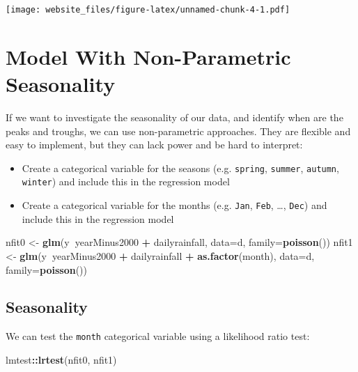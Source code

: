 \documentclass[]{book}
\newenvironment{Shaded}{\begin{snugshade}}{\end{snugshade}}
\newcommand{\KeywordTok}[1]{\textcolor[rgb]{0.13,0.29,0.53}{\textbf{#1}}}
\newcommand{\DataTypeTok}[1]{\textcolor[rgb]{0.13,0.29,0.53}{#1}}
\newcommand{\StringTok}[1]{\textcolor[rgb]{0.31,0.60,0.02}{#1}}
\newcommand{\OperatorTok}[1]{\textcolor[rgb]{0.81,0.36,0.00}{\textbf{#1}}}
\newcommand{\NormalTok}[1]{#1}
\providecommand{\tightlist}{%
  \setlength{\itemsep}{0pt}\setlength{\parskip}{0pt}}
\begin{document}
\texttt{[image: website\_files/figure-latex/unnamed-chunk-4-1.pdf]}

\section{Model With Non-Parametric
Seasonality}\label{model-with-non-parametric-seasonality}

If we want to investigate the seasonality of our data, and identify when
are the peaks and troughs, we can use non-parametric approaches. They
are flexible and easy to implement, but they can lack power and be hard
to interpret:

\begin{itemize}
\tightlist
\item
  Create a categorical variable for the seasons (e.g. \texttt{spring},
  \texttt{summer}, \texttt{autumn}, \texttt{winter}) and include this in
  the regression model
\item
  Create a categorical variable for the months (e.g. \texttt{Jan},
  \texttt{Feb}, \ldots{}, \texttt{Dec}) and include this in the
  regression model
\end{itemize}

\begin{Shaded}
\begin{Highlighting}[]
\NormalTok{nfit0 <-}\StringTok{ }\KeywordTok{glm}\NormalTok{(y}\OperatorTok{~}\NormalTok{yearMinus2000 }\OperatorTok{+}\StringTok{ }\NormalTok{dailyrainfall, }\DataTypeTok{data=}\NormalTok{d, }\DataTypeTok{family=}\KeywordTok{poisson}\NormalTok{())}
\NormalTok{nfit1 <-}\StringTok{ }\KeywordTok{glm}\NormalTok{(y}\OperatorTok{~}\NormalTok{yearMinus2000 }\OperatorTok{+}\StringTok{ }\NormalTok{dailyrainfall }\OperatorTok{+}\StringTok{ }\KeywordTok{as.factor}\NormalTok{(month), }\DataTypeTok{data=}\NormalTok{d, }\DataTypeTok{family=}\KeywordTok{poisson}\NormalTok{())}
\end{Highlighting}
\end{Shaded}

\subsection{Seasonality}\label{seasonality}

We can test the \texttt{month} categorical variable using a likelihood
ratio test:

\begin{Shaded}
\begin{Highlighting}[]
\NormalTok{lmtest}\OperatorTok{::}\KeywordTok{lrtest}\NormalTok{(nfit0, nfit1)}
\end{Highlighting}
\end{Shaded}
\end{document}
